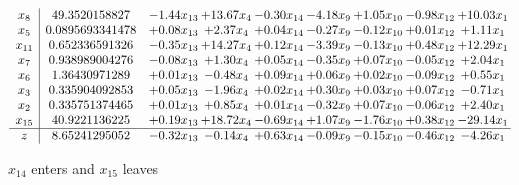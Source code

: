 \documentclass[9pt]{article}
\begin{document}
 \[\begin{array}{c| c c@{\hskip 2pt} c@{\hskip 2pt} c@{\hskip 2pt} c@{\hskip 2pt} c@{\hskip 2pt} c@{\hskip 2pt} c@{\hskip 2pt} }
 x_{8}   &  49.3520158827 & -1.44 x_{13} & + 13.67 x_{4} & -0.30 x_{14} & -4.18 x_{9} & +  1.05 x_{10} & -0.98 x_{12} & + 10.03 x_{1}\\
 x_{5}   &  0.0895693341478 & +  0.08 x_{13} & +  2.37 x_{4} & +  0.04 x_{14} & -0.27 x_{9} & -0.12 x_{10} & +  0.01 x_{12} & +  1.11 x_{1}\\
 x_{11}   &  0.652336591326 & -0.35 x_{13} & + 14.27 x_{4} & +  0.12 x_{14} & -3.39 x_{9} & -0.13 x_{10} & +  0.48 x_{12} & + 12.29 x_{1}\\
 x_{7}   &  0.938989004276 & -0.08 x_{13} & +  1.30 x_{4} & +  0.05 x_{14} & -0.35 x_{9} & +  0.07 x_{10} & -0.05 x_{12} & +  2.04 x_{1}\\
 x_{6}   &  1.36430971289 & +  0.01 x_{13} & -0.48 x_{4} & +  0.09 x_{14} & +  0.06 x_{9} & +  0.02 x_{10} & -0.09 x_{12} & +  0.55 x_{1}\\
 x_{3}   &  0.335904092853 & +  0.05 x_{13} & -1.96 x_{4} & +  0.02 x_{14} & +  0.30 x_{9} & +  0.03 x_{10} & +  0.07 x_{12} & -0.71 x_{1}\\
 x_{2}   &  0.335751374465 & +  0.01 x_{13} & +  0.85 x_{4} & +  0.01 x_{14} & -0.32 x_{9} & +  0.07 x_{10} & -0.06 x_{12} & +  2.40 x_{1}\\
 x_{15}   &  40.9221136225 & +  0.19 x_{13} & + 18.72 x_{4} & -0.69 x_{14} & +  1.07 x_{9} & -1.76 x_{10} & +  0.38 x_{12} & -29.14 x_{1}\\
\hline
z    &  8.65241295052 & -0.32 x_{13} & -0.14 x_{4} & +  0.63 x_{14} & -0.09 x_{9} & -0.15 x_{10} & -0.46 x_{12} & -4.26 x_{1}\\
\end{array}\]


 $ x_{14} $ enters and $ x_{15} $ leaves 
\end{document}
